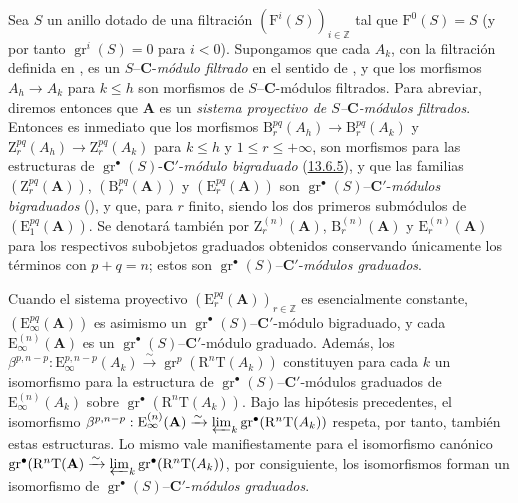 \begin{env}[13.7.6]
\label{0.13.7.6}
\label{0.13.7.6-fr}
Sea $S$ un anillo dotado de una filtración
$(\mathrm F^i(S))_{i\in\mathbb Z}$ tal que
$\mathrm F^0(S)=S$ (y por tanto
$\operatorname{gr}^i(S)=0$ para $i<0$).
Supongamos que cada $A_k$, con la filtración definida en
, es un
$S$--$\boldsymbol{C}$-\emph{módulo filtrado} en el sentido de , y que los
morfismos $A_h\to A_k$ para $k\leq h$ son morfismos de
$S$--$\boldsymbol{C}$-módulos filtrados.
Para abreviar, diremos entonces que $\mathbf A$ es un
\emph{sistema proyectivo de $S$--$\boldsymbol{C}$-módulos filtrados}. Entonces es inmediato que los morfismos $\mathrm B_r^{pq}(A_h)\to\mathrm B_r^{pq}(A_k)$ y $\mathrm Z_r^{pq}(A_h)\to\mathrm Z_r^{pq}(A_k)$ para $k\leq h$ y
$1\leq r\leq+\infty$, son morfismos para las estructuras de $\operatorname{gr}^\bullet(S)$-$\boldsymbol{C}'$-\emph{módulo bigraduado} (\hyperref[0.13.6.5-fr]{13.6.5}), y que las familias $(\mathrm Z_r^{pq}(\mathbf A))$, $(\mathrm B_r^{pq}(\mathbf A))$ y $(\mathrm E_r^{pq}(\mathbf A))$ son $\operatorname{gr}^\bullet(S)$--$\boldsymbol{C}'$-\emph{módulos bigraduados}
(), y que, para $r$ finito, siendo los dos primeros submódulos de $(\mathrm E_1^{pq}(\mathbf A))$. Se denotará también por $\mathrm Z_r^{(n)}(\mathbf A)$,
$\mathrm B_r^{(n)}(\mathbf A)$ y
$\mathrm E_r^{(n)}(\mathbf A)$ para los respectivos subobjetos graduados
obtenidos conservando únicamente los términos con $p+q=n$; estos son
$\operatorname{gr}^\bullet(S)$--$\boldsymbol{C}'$-\emph{módulos graduados}.

Cuando el sistema proyectivo
$(\mathrm E_r^{pq}(\mathbf A))_{r\in\mathbb Z}$ es esencialmente constante,
$(\mathrm E_\infty^{pq}(\mathbf A))$ es asimismo un
$\operatorname{gr}^\bullet(S)$--$\boldsymbol{C}'$-módulo bigraduado, y cada
$\mathrm E_\infty^{(n)}(\mathbf A)$ es un
$\operatorname{gr}^\bullet(S)$--$\boldsymbol{C}'$-módulo graduado. Además, los $\beta^{p,n-p}:\mathrm E_\infty^{p,n-p}(A_k)\xrightarrow{\sim}
\operatorname{gr}^p(\mathrm R^n\mathrm T(A_k))$ constituyen para cada $k$ un isomorfismo para la estructura de $\operatorname{gr}^\bullet(S)$--$\boldsymbol{C}'$-módulos graduados de
$\mathrm E_\infty^{(n)}(A_k)$ sobre
$\operatorname{gr}^\bullet(\mathrm R^n\mathrm T(A_k))$.
Bajo las hipótesis precedentes, el isomorfismo
$\beta^{p,n-p}:\mathrm E_\infty^{(n)}(\mathbf A)\xrightarrow{\sim}
\varprojlim_k\operatorname{gr}^\bullet(\mathrm R^n\mathrm T(A_k))$
respeta, por tanto, también estas estructuras.
Lo mismo vale manifiestamente para el isomorfismo canónico
$\operatorname{gr}^\bullet(\mathrm R^n\mathrm T(\mathbf A)
\xrightarrow{\sim}
\varprojlim_k\operatorname{gr}^\bullet(\mathrm R^n\mathrm T(A_k))$,
por consiguiente, los isomorfismos  forman un
isomorfismo de
$\operatorname{gr}^\bullet(S)$--$\boldsymbol{C}'$-\emph{módulos graduados}.
\end{env}

